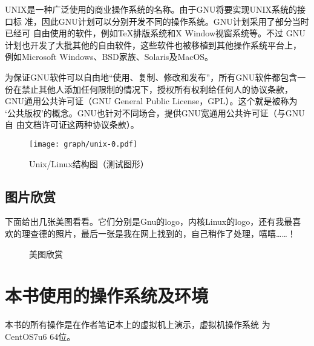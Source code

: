 UNIX是一种广泛使用的商业操作系统的名称。由于GNU将要实现UNIX系统的接口标
准，因此GNU计划可以分别开发不同的操作系统。GNU计划采用了部分当时已经可
自由使用的软件，例如\TeX\index{\TeX}排版系统和X Window视窗系统等。不过
GNU计划也开发了大批其他的自由软件，这些软件也被移植到其他操作系统平台上，
例如Microsoft Windows、BSD家族、Solaris及MacOS。

为保证GNU软件可以自由地“使用、复制、修改和发布”，所有GNU软件都包含一
份在禁止其他人添加任何限制的情况下，授权所有权利给任何人的协议条款，
GNU通用公共许可证（GNU General Public License，GPL）。这个就是被称为
‘公共版权’的概念。GNU也针对不同场合，提供GNU宽通用公共许可证（与GNU自
  由文档许可证这两种协议条款）\cite{Kline}。

\begin{figure}[!htbp]
  \centering
  \texttt{[image: graph/unix-0.pdf]}
  \caption{Unix/Linux结构图（测试图形）}
  \label{fig:UnixTopo}
\end{figure}

\subsection{图片欣赏}
\label{subsec:picView}

下面给出几张美图看看。它们分别是Gnu的logo，内核Linux的logo，还有我最喜
欢的理查德的照片，最后一张是我在网上找到的，自己稍作了处理，嘻嘻……！

\begin{figure}[!htbp]
  \centering
  \hspace{30pt}
  \vspace{10pt}
  \caption{美图欣赏}
  \label{fig:meituxinshang}
\end{figure}

\section{本书使用的操作系统及环境}
\label{sec:thisOS}

本书的所有操作是在作者笔记本上的虚拟机上演示，虚拟机操作系统
为CentOS7u6 64位。

